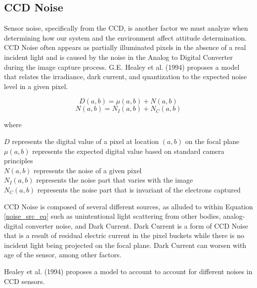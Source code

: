 \subsection*{CCD Noise}
\par \qquad Sensor noise, specifically from the CCD, is another factor we must analyze when determining how our system and the environment affect attitude determination.
CCD Noise often appears as partially illuminated pixels in the absence of a real incident light and is caused by the noise in the Analog to Digital Converter during the image capture process.
G.E. Healey et al. (1994) proposes a model that relates the irradiance, dark current, and quantization to the expected noise level in a given pixel\cite{radiometric_ccd_camera_calibration}.

\begin{equation}
    D(a,b) = \mu(a,b) + N(a,b)
\end{equation}
\begin{equation} \label{noise_src_eq}
    N(a,b) = N_I(a,b) + N_C(a,b)
\end{equation}

where
\begin{center}
    $D$ represents the digital value of a pixel at location $(a,b)$ on the focal plane\\
    $\mu(a,b)$ represents the expected digital value based on standard camera principles\\
    $N(a,b)$ represents the noise of a given pixel\\
    $N_I(a,b)$ represents the noise part that varies with the image\\
    $N_C(a,b)$ represents the noise part that is invariant of the electrons captured
\end{center}

\par \qquad CCD Noise is composed of several different sources, as alluded to within Equation \ref{noise_src_eq} such as unintentional light scattering from other bodies, analog-digital converter noise, and Dark Current.
Dark Current is a form of CCD Noise that is a result of residual electric current in the pixel buckets while there is no incident light being projected on the focal plane.
Dark Current can worsen with age of the sensor, among other factors.

\par \qquad Healey et al. (1994) proposes a model to account to account for different noises in CCD sensors.

